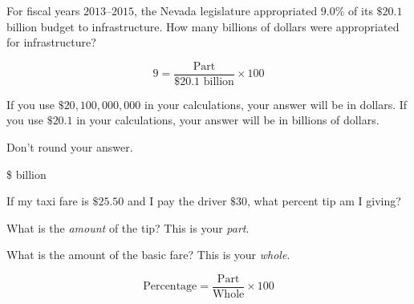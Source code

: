\documentclass{ximera}
\begin{document}
\begin{question}
For fiscal years $2013$--$2015$, the Nevada legislature appropriated $9.0\%$ of its $\$20.1$ billion budget to infrastructure. How many billions of dollars were appropriated for infrastructure? 	

\begin{hint}
\[9=\frac{\text{Part}}{\$20.1\text{ billion}}\times 100\]
\end{hint}
\begin{hint}
If you use $\$20,100,000,000$ in your calculations, your answer will be in dollars. If you use $\$20.1$ in your calculations, your answer will be in billions of dollars.
\end{hint}
\begin{hint}
Don't round your answer.
\end{hint}
\$ billion

\end{question}

\begin{question}
If my taxi fare is $\$25.50$ and I pay the driver $\$30$, what percent tip am I giving?

    \begin{multipleChoice}
    \end{multipleChoice}
    \begin{hint}
    What is the \emph{amount} of the tip? This is your \emph{part}.
    \end{hint}
    \begin{hint}
   What is the amount of the basic fare? This is your \emph{whole}.
    \end{hint}
  	\begin{hint}
    \[\text{Percentage}=\frac{\text{Part}}{\text{Whole}}\times 100\]
    \end{hint}

\end{question}
\end{document}
